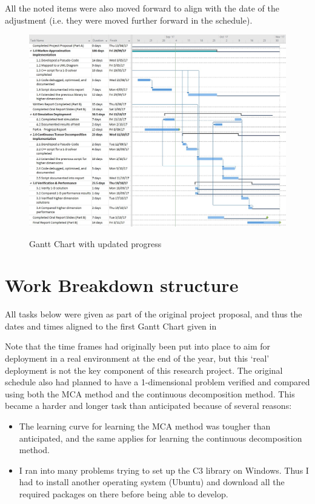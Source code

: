 \documentclass[11pt,draftd]{article}
\begin{document}
\begin{appendices}
	All the noted items were also moved forward to align with the date of the adjustment (i.e. they were moved further forward in the schedule).
	\[\]
	\begin{figure}[h!]
		\centering
		\includegraphics[scale=0.54]{UpdatedGanttProgressSem2}
		\label{UpdatedGanttProgress}
		\caption{Gantt Chart with updated progress}
	\end{figure}

\newpage

	\section{Work Breakdown structure}\label{app_itemB}
	All tasks below were given as part of the original project proposal, and thus the dates and times aligned to the first Gantt Chart given in 
	
	Note that the time frames had originally been put into place to aim for deployment in a real environment at the end of the year, but this ‘real’ deployment is not the key component of this research project. The original schedule also had planned to have a 1-dimensional problem verified and compared using both the MCA method and the continuous decomposition method. This became a harder and longer task than anticipated because of several reasons: \\
	\begin{itemize}
		\item The learning curve for learning the MCA method was tougher than anticipated, and the same applies for learning the continuous decomposition method.
		\item I ran into many problems trying to set up the C3 library on Windows. Thus I had to install another operating system (Ubuntu) and download all the required packages on there before being able to develop. \\
	\end{itemize}
	

\end{appendices}
\end{document}
